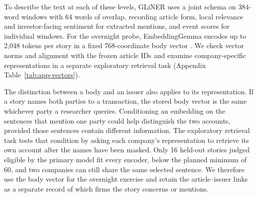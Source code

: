 To describe the text at each of these levels, GLiNER uses a joint schema
on 384-word windows with 64 words of overlap, recording article form,
local relevance and investor-facing sentiment for extracted mentions,
and event scores for individual windows. For the overnight probe,
EmbeddingGemma encodes up to 2,048 tokens per story in a fixed
768-coordinate body vector \citep{embeddinggemma2025}. We check vector
norms and alignment with the frozen article IDs and examine
company-specific representations in a separate exploratory retrieval task
(Appendix Table~\ref{tab:app-vectors}).

The distinction between a body and an issuer also applies to its
representation. If a story names both parties to a transaction, the
stored body vector is the same whichever party a researcher queries.
Conditioning an embedding on the sentences that mention one party
could help distinguish the two accounts, provided those sentences
contain different information. The exploratory retrieval task tests
that condition by asking each company's representation to retrieve
its own account after the names have been masked. Only 16 held-out
stories judged eligible by the primary model fit every encoder,
below the planned minimum of 60, and two companies can still share
the same selected sentence. We therefore use the body vector for the
overnight exercise and retain the article--issuer links as a separate
record of which firms the story concerns or mentions.

